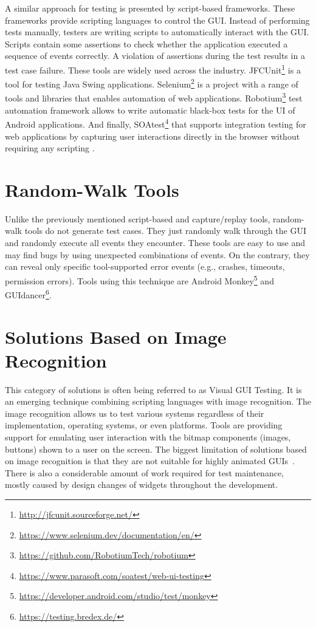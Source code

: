 A similar approach for testing is presented by script-based frameworks. These frameworks provide scripting languages to control the GUI. Instead of performing tests manually, testers are writing scripts to automatically interact with the GUI. Scripts contain some assertions to check whether the application executed a sequence of events correctly. A violation of assertions during the test results in a test case failure. These tools are widely used across the industry. 
JFCUnit\footnote{\url{http://jfcunit.sourceforge.net/}} is a tool for testing Java Swing applications. 
Selenium\footnote{\url{https://www.selenium.dev/documentation/en/}} is a project with a range of tools and libraries that enables automation of web applications. Robotium\footnote{\url{https://github.com/RobotiumTech/robotium}} test automation framework allows to write automatic black-box tests for the UI of Android applications. And finally, SOAtest\footnote{\url{https://www.parasoft.com/soatest/web-ui-testing}} that supports integration testing for web applications by capturing user interactions directly in the browser without requiring any scripting \cite{NguyenBao2014Gait}.

\section{Random-Walk Tools}
Unlike the previously mentioned script-based and capture/replay tools, random-walk tools do not generate test cases. They just randomly walk through the GUI and randomly execute all events they encounter. These tools are easy to use and may find bugs by using unexpected combinations of events. On the contrary, they can reveal only specific tool-supported error events (e.g., crashes, timeouts, permission errors). Tools using this technique are Android Monkey\footnote{\url{https://developer.android.com/studio/test/monkey}} and GUIdancer\footnote{\url{https://testing.bredex.de/}}.

\section{Solutions Based on Image Recognition}
This category of solutions is often being referred to as Visual GUI Testing. It is an emerging technique combining scripting languages with image recognition. The image recognition allows us to test various systems regardless of their implementation, operating systems, or even platforms. Tools are providing support for emulating user interaction with the bitmap components (images, buttons) shown to a user on the screen. The biggest limitation of solutions based on image recognition is that they are not suitable for highly animated GUIs~\cite{guitesting}. There is also a considerable amount of work required for test maintenance, mostly caused by design changes of widgets throughout the development.   

